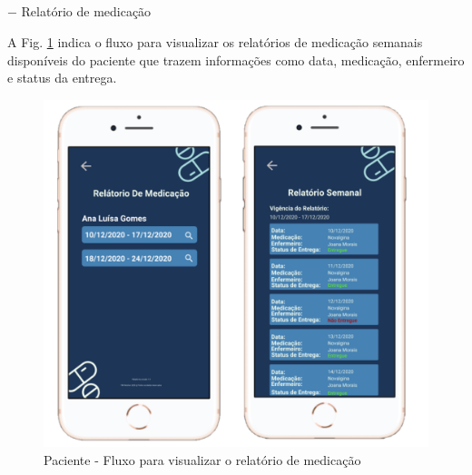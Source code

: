 \subparagraph*{} $-$ Relatório de medicação

A Fig. \ref{fig:prototipo_paciente_relatorioDeMedicacao} indica o fluxo para visualizar os relatórios de medicação semanais disponíveis do paciente que trazem informações como data, medicação, enfermeiro e status da entrega.

\begin{figure}[H]
    \centering
    \includegraphics[width=12cm]{figuras/software/Atual_prototipo/Paciente_relatorioDeMedicacao.png}
    \caption{Paciente - Fluxo para visualizar o relatório de medicação}
    \label{fig:prototipo_paciente_relatorioDeMedicacao}
\end{figure}

